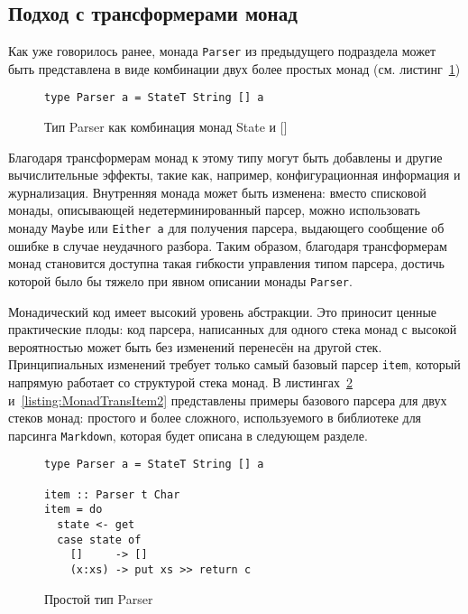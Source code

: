 \subsection{Подход с трансформерами монад}

Как уже говорилось ранее, монада \lstinline{Parser} из предыдущего подраздела 
может быть представлена в виде комбинации двух более простых монад 
(см. листинг~\ref{listing:MonadTransParser})

\begin{figure}[h]
\begin{lstlisting}
type Parser a = StateT String [] a
\end{lstlisting}
\caption{Тип Parser как комбинация монад State и []}
\label{listing:MonadTransParser}
\end{figure}

Благодаря трансформерам монад к этому типу могут быть добавлены и другие 
вычислительные эффекты, такие как, например, конфигурационная информация и 
журнализация. Внутренняя монада может быть изменена: вместо списковой монады, 
описывающей недетерминированный парсер, можно использовать монаду 
\lstinline{Maybe} или \lstinline{Either a} для получения парсера, выдающего 
сообщение об ошибке в случае неудачного разбора. Таким образом, благодаря 
трансформерам монад становится доступна такая гибкости управления типом парсера,
достичь которой было бы тяжело при явном описании монады \lstinline{Parser}.

Монадический код имеет высокий уровень абстракции. Это приносит ценные 
практические плоды: код парсера, написанных для одного стека монад с высокой 
вероятностью может быть без изменений перенесён на другой стек. Принципиальных 
изменений требует только самый базовый парсер \lstinline{item}, который напрямую
работает со структурой стека монад. В листингах~\ref{listing:MonadTransItem1}
и~\ref{listing:MonadTransItem2} представлены примеры базового парсера для двух
стеков монад: простого и более сложного, используемого в библиотеке для
парсинга \lstinline{Markdown}, которая будет описана в следующем разделе.

\begin{figure}[t]
\begin{lstlisting}
type Parser a = StateT String [] a

item :: Parser t Char
item = do
  state <- get
  case state of
    []     -> []
    (x:xs) -> put xs >> return c
\end{lstlisting}
\caption{Простой тип Parser}
\label{listing:MonadTransItem1}
\end{figure}

